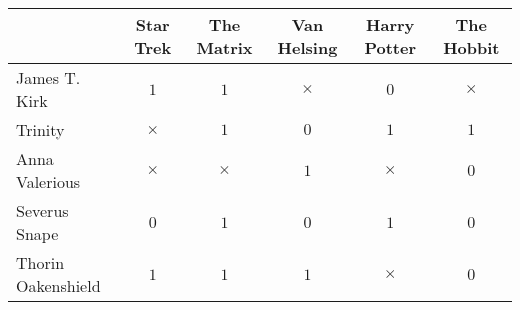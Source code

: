 \documentclass{standalone}
\begin{document}
  \renewcommand{\arraystretch}{1.5}
  \begin{tabular}{lccccc}
    \hline
     & Star Trek & The Matrix & Van Helsing & Harry Potter & The Hobbit \\
    \hline
    \hline
    James T. Kirk & $1$ & $1$ & $\times$ & $0$ & $\times$\\
    Trinity & $\times$ & $1$ & $0$ & $1$ & $1$\\
    Anna Valerious & $\times$ & $\times$ & $1$ & $\times$ & $0$\\
    Severus Snape & $0$ & $1$ & $0$ & $1$ & $0$\\
    Thorin Oakenshield & $1$ & $1$ & $1$ & $\times$ & $0$\\
    \hline
  \end{tabular}
\end{document}
